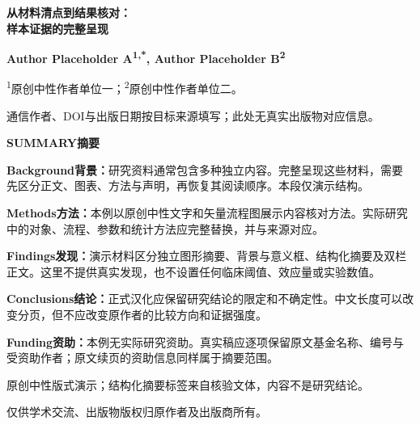 \documentclass[UTF8,fontset=none,twoside,scheme=plain]{ctexart}
\newcommand{\MedTitle}{从材料清点到结果核对：\\样本证据的完整呈现}
\newcommand{\MedSummary}[2]{\noindent\textcolor{MedRed}{\bfseries #1}\enspace\textcolor{MedBlue}{#2}\par\vspace{4bp}}
\begin{document}
{\noindent\bfseries\fontsize{22bp}{27bp}\selectfont\MedTitle\par}\vspace{10bp}
{\noindent\bfseries\fontsize{9bp}{12bp}\selectfont Author Placeholder A\textsuperscript{1,*}, Author Placeholder B\textsuperscript{2}\par}\vspace{4bp}
{\noindent\fontsize{7.5bp}{10.4bp}\selectfont\textsuperscript{1}原创中性作者单位一；\textsuperscript{2}原创中性作者单位二。\par *通信作者、DOI与出版日期按目标来源填写；此处无真实出版物对应信息。\par}\vspace{17bp}
\begingroup\setlength{\fboxsep}{12bp}\setlength{\fboxrule}{.5bp}
\noindent{}\par\endgroup\vspace{16bp}
{\noindent\color{MedRed}\bfseries SUMMARY\quad 摘要\par}\vspace{9bp}
{\fontsize{10bp}{14bp}\selectfont
\MedSummary{Background\quad 背景：}{研究资料通常包含多种独立内容。完整呈现这些材料，需要先区分正文、图表、方法与声明，再恢复其阅读顺序。本段仅演示结构。}
\MedSummary{Methods\quad 方法：}{本例以原创中性文字和矢量流程图展示内容核对方法。实际研究中的对象、流程、参数和统计方法应完整替换，并与来源对应。}
\MedSummary{Findings\quad 发现：}{演示材料区分独立图形摘要、背景与意义框、结构化摘要及双栏正文。这里不提供真实发现，也不设置任何临床阈值、效应量或实验数值。}
\MedSummary{Conclusions\quad 结论：}{正式汉化应保留研究结论的限定和不确定性。中文长度可以改变分页，但不应改变原作者的比较方向和证据强度。}
\MedSummary{Funding\quad 资助：}{本例无实际研究资助。真实稿应逐项保留原文基金名称、编号与受资助作者；原文续页的资助信息同样属于摘要范围。}
}\vfill
{\noindent\fontsize{7.6bp}{10bp}\selectfont 原创中性版式演示；结构化摘要标签来自核验文体，内容不是研究结论。\par 仅供学术交流、出版物版权归原作者及出版商所有。}
\clearpage
\end{document}
